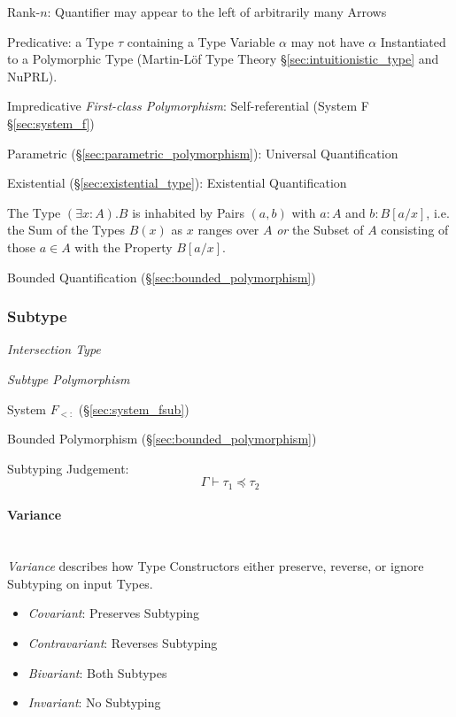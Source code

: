 Rank-$n$: Quantifier may appear to the left of arbitrarily many Arrows

Predicative: a Type $\tau$ containing a Type Variable $\alpha$ may not
have $\alpha$ Instantiated to a Polymorphic Type (Martin-L\"of Type
Theory \S\ref{sec:intuitionistic_type} and NuPRL).

Impredicative \emph{First-class Polymorphism}: Self-referential
(System F \S\ref{sec:system_f})

Parametric (\S\ref{sec:parametric_polymorphism}): Universal
Quantification

Existential (\S\ref{sec:existential_type}): Existential Quantification

The Type $(\exists x : A).B$ is inhabited by Pairs $(a,b)$ with $a:A$
and $b:B[a/x]$, i.e. the Sum of the Types $B(x)$ as $x$ ranges over
$A$ \emph{or} the Subset of $A$ consisting of those $a \in A$ with the
Property $B[a/x]$.

Bounded Quantification (\S\ref{sec:bounded_polymorphism})



\subsubsection{Subtype}\label{sec:subtype}

\emph{Intersection Type}

\emph{Subtype Polymorphism}

System $F_{<:}$ (\S\ref{sec:system_fsub})

Bounded Polymorphism (\S\ref{sec:bounded_polymorphism})

Subtyping Judgement:
\[
  \Gamma \vdash \tau_1 \preceq \tau_2
\]



\paragraph{Variance}\label{sec:variance}
\hfill \\

\emph{Variance} describes how Type Constructors either preserve,
reverse, or ignore Subtyping on input Types.

\begin{itemize}
  \item \emph{Covariant}: Preserves Subtyping
  \item \emph{Contravariant}: Reverses Subtyping
  \item \emph{Bivariant}: Both Subtypes
  \item \emph{Invariant}: No Subtyping
\end{itemize}

